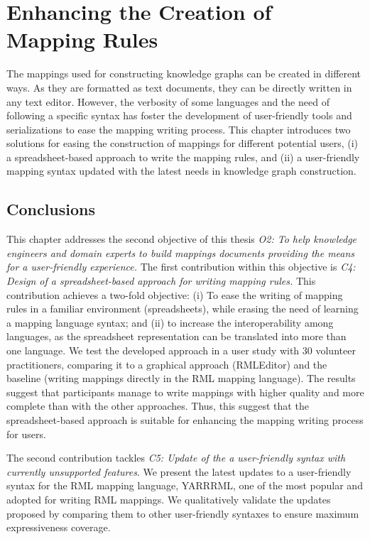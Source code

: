 
\chapter{Enhancing the Creation of Mapping Rules}
\label{chapter:creation}

The mappings used for constructing knowledge graphs can be created in different ways. As they are formatted as text documents, they can be directly written in any text editor. However, the verbosity of some languages and the need of following a specific syntax has foster the development of user-friendly tools and serializations to ease the mapping writing process. This chapter introduces two solutions for easing the construction of mappings for different potential users, (i) a spreadsheet-based approach to write the mapping rules, and (ii) a user-friendly mapping syntax updated with the latest needs in knowledge graph construction.





\section{Conclusions}

This chapter addresses the second objective of this thesis \textit{O2: To help knowledge engineers and domain experts to build mappings documents providing the means for a user-friendly experience.}
The first contribution within this objective is \textit{C4: Design of a spreadsheet-based approach for writing mapping rules.} This contribution achieves a two-fold objective: (i) To ease the writing of mapping rules in a familiar environment (spreadsheets), while erasing the need of learning a mapping language syntax; and (ii) to increase the interoperability among languages, as the spreadsheet representation can be translated into more than one language. We test the developed approach in a user study with 30 volunteer practitioners, comparing it to a graphical approach (RMLEditor) and the baseline (writing mappings directly in the RML mapping language). The results suggest that participants manage to write mappings with higher quality and more complete than with the other approaches. Thus, this suggest that the spreadsheet-based approach is suitable for enhancing the mapping writing process for users. 

The second contribution tackles \textit{C5: Update of the a user-friendly syntax with currently unsupported features}. 
We present the latest updates to a user-friendly syntax for the RML mapping language, YARRRML, one of the most popular and adopted for writing RML mappings. 
We qualitatively validate the updates proposed by comparing them to other user-friendly syntaxes to ensure maximum expressiveness coverage. 

